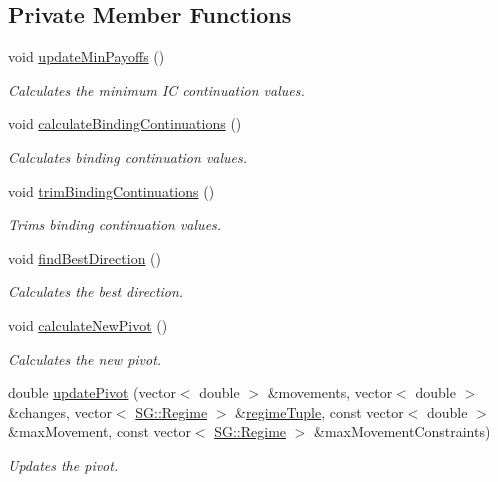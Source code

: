 \subsection*{Private Member Functions}
\begin{DoxyCompactItemize}
\item 
void \hyperlink{classSGApprox_aea5ce8a2f48c7a572477f5f60520d565}{update\+Min\+Payoffs} ()
\begin{DoxyCompactList}\small\item\em Calculates the minimum IC continuation values. \end{DoxyCompactList}\item 
void \hyperlink{classSGApprox_a22804ad7335d810f6a48a304e618b4f2}{calculate\+Binding\+Continuations} ()
\begin{DoxyCompactList}\small\item\em Calculates binding continuation values. \end{DoxyCompactList}\item 
void \hyperlink{classSGApprox_abbd46d241613c871ecba24e10e115c56}{trim\+Binding\+Continuations} ()
\begin{DoxyCompactList}\small\item\em Trims binding continuation values. \end{DoxyCompactList}\item 
void \hyperlink{classSGApprox_a17d94998661d7d3fdb0618c8ce7dc53b}{find\+Best\+Direction} ()
\begin{DoxyCompactList}\small\item\em Calculates the best direction. \end{DoxyCompactList}\item 
void \hyperlink{classSGApprox_ad545fa06b93fd2241c798cf8661cc092}{calculate\+New\+Pivot} ()
\begin{DoxyCompactList}\small\item\em Calculates the new pivot. \end{DoxyCompactList}\item 
double \hyperlink{classSGApprox_afdc9f582e9b83dc68393da177330561e}{update\+Pivot} (vector$<$ double $>$ \&movements, vector$<$ double $>$ \&changes, vector$<$ \hyperlink{namespaceSG_a139e4dec41ea0f38aae1f93f60cfff60}{S\+G\+::\+Regime} $>$ \&\hyperlink{classSGApprox_a01f7878f807a2143ce4a7b64bf3cc110}{regime\+Tuple}, const vector$<$ double $>$ \&max\+Movement, const vector$<$ \hyperlink{namespaceSG_a139e4dec41ea0f38aae1f93f60cfff60}{S\+G\+::\+Regime} $>$ \&max\+Movement\+Constraints)
\begin{DoxyCompactList}\small\item\em Updates the pivot. \end{DoxyCompactList}\item 

\end{DoxyCompactItemize}
